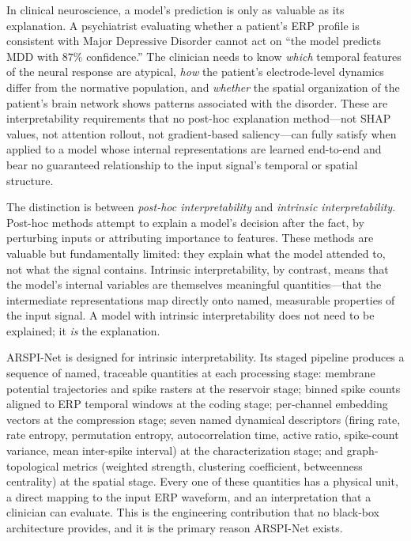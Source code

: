 In clinical neuroscience, a model's prediction is only as valuable as its explanation. A psychiatrist evaluating whether a patient's ERP profile is consistent with Major Depressive Disorder cannot act on ``the model predicts MDD with $87\%$ confidence.'' The clinician needs to know \emph{which} temporal features of the neural response are atypical, \emph{how} the patient's electrode-level dynamics differ from the normative population, and \emph{whether} the spatial organization of the patient's brain network shows patterns associated with the disorder. These are interpretability requirements that no post-hoc explanation method---not SHAP values, not attention rollout, not gradient-based saliency---can fully satisfy when applied to a model whose internal representations are learned end-to-end and bear no guaranteed relationship to the input signal's temporal or spatial structure.

The distinction is between \emph{post-hoc interpretability} and \emph{intrinsic interpretability}. Post-hoc methods attempt to explain a model's decision after the fact, by perturbing inputs or attributing importance to features. These methods are valuable but fundamentally limited: they explain what the model attended to, not what the signal contains. Intrinsic interpretability, by contrast, means that the model's internal variables are themselves meaningful quantities---that the intermediate representations map directly onto named, measurable properties of the input signal. A model with intrinsic interpretability does not need to be explained; it \emph{is} the explanation.

ARSPI-Net is designed for intrinsic interpretability. Its staged pipeline produces a sequence of named, traceable quantities at each processing stage: membrane potential trajectories and spike rasters at the reservoir stage; binned spike counts aligned to ERP temporal windows at the coding stage; per-channel embedding vectors at the compression stage; seven named dynamical descriptors (firing rate, rate entropy, permutation entropy, autocorrelation time, active ratio, spike-count variance, mean inter-spike interval) at the characterization stage; and graph-topological metrics (weighted strength, clustering coefficient, betweenness centrality) at the spatial stage. Every one of these quantities has a physical unit, a direct mapping to the input ERP waveform, and an interpretation that a clinician can evaluate. This is the engineering contribution that no black-box architecture provides, and it is the primary reason ARSPI-Net exists.

